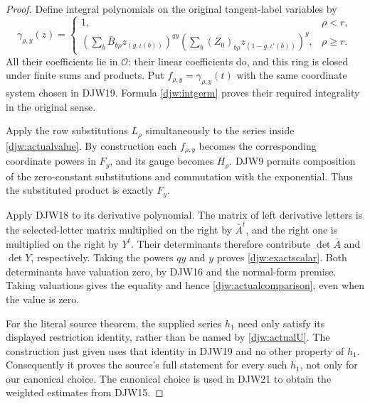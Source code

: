 \documentclass[11pt,a4paper]{article}
\numberwithin{equation}{section}
\theoremstyle{remark}\newtheorem{remark}[theorem]{Remark}
\begin{document}
\begin{proof}
Define integral polynomials on the original tangent-label variables by
\[
 \gamma_{\rho,y}(z)=
 \begin{cases}
 1,&\rho<r,\\[2pt]
 \displaystyle
 \left(\sum_b\bar B_{b\rho}z_{(g,\iota(b))}\right)^{qy}
 \left(\sum_b(Z_0)_{b\rho}z_{(1-g,\iota'(b))}\right)^y,
      &\rho\ge r.
 \end{cases}
\]
All their coefficients lie in $\mathcal O$: their linear
coefficients do, and this ring is closed under finite sums and
products.  Put $f_{\rho,y}=\gamma_{\rho,y}(t)$ with the same
coordinate system chosen in DJW19.  Formula \eqref{djw:intgerm}
proves their required integrality in the original sense.

Apply the row substitutions $L_\rho$ simultaneously to the series
inside \eqref{djw:actualvalue}.  By construction each
$f_{\rho,y}$ becomes the corresponding coordinate powers in $F_y$,
and its gauge becomes $H_\rho$.  DJW9 permits composition of the
zero-constant substitutions and commutation with the exponential.
Thus the substituted product is exactly $F_y$.

Apply DJW18 to its derivative polynomial.
The matrix of left derivative letters is the selected-letter
matrix multiplied on the right by $\bar A^t$, and the right
one is multiplied on the right by $Y^t$.  Their determinants
therefore contribute $\det\bar A$ and $\det Y$, respectively.
Taking the powers $qy$ and $y$ proves \eqref{djw:exactscalar}.
Both determinants have valuation zero, by DJW16 and the normal-form
premise.  Taking valuations gives the equality and hence
\eqref{djw:actualcomparison}, even when the value is zero.

For the literal source theorem, the supplied series $h_1$ need
only satisfy its displayed restriction identity, rather than be
named by \eqref{djw:actualU}.  The construction just given uses
that identity in DJW19 and no other property of $h_1$.
Consequently it proves the source's full statement for every such
$h_1$, not only for our canonical choice.  The canonical choice
is used in DJW21 to obtain the weighted estimates from DJW15.
\end{proof}

\end{document}
